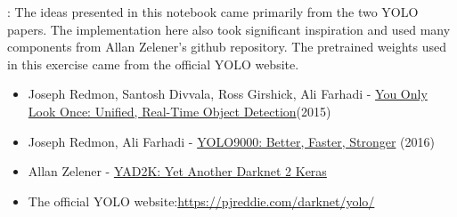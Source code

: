 : The ideas presented in this notebook came primarily from the two YOLO papers. The implementation here also took significant inspiration and used many components from Allan Zelener's github repository. The pretrained weights used in this exercise came from the official YOLO website.
\begin{itemize}
\item Joseph Redmon, Santosh Divvala, Ross Girshick, Ali Farhadi - \href{https://arxiv.org/abs/1506.02640)}{You Only Look Once: Unified, Real-Time Object Detection}(2015)
\item Joseph Redmon, Ali Farhadi - \href{https://arxiv.org/abs/1612.08242}{YOLO9000: Better, Faster, Stronger} (2016)
\item Allan Zelener - \href{https://github.com/allanzelener/YAD2K}{YAD2K: Yet Another Darknet 2 Keras}
\item The official YOLO website:\url{https://pjreddie.com/darknet/yolo/}
\end{itemize}
\clearpage